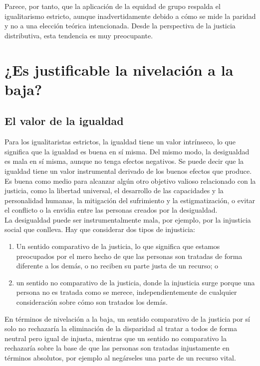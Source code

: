 Parece, por tanto, que la aplicación de la equidad de grupo respalda el igualitarismo estricto, aunque inadvertidamente debido a cómo se mide la paridad y no a una elección teórica intencionada. Desde la perspectiva de la justicia distributiva, esta tendencia es muy preocupante.

\section{¿Es justificable la nivelación a la baja?}
\subsection{El valor de la igualdad}
Para los igualitaristas estrictos, la igualdad tiene un valor intrínseco, lo que significa que la igualdad es buena en sí misma. Del mismo modo, la desigualdad es mala en sí misma, aunque no tenga efectos negativos. Se puede decir que la igualdad tiene un valor instrumental derivado de los buenos efectos que produce. Es buena como medio para alcanzar algún otro objetivo valioso relacionado con la justicia, como la libertad universal, el desarrollo de las capacidades y la personalidad humanas, la mitigación del sufrimiento y la estigmatización, o evitar el conflicto o la envidia entre las personas creados por la desigualdad.\\

La desigualdad puede ser instrumentalmente mala, por ejemplo, por la injusticia social que conlleva. Hay que considerar dos tipos de injusticia: 
\begin{enumerate}[(1)]
    \item Un sentido comparativo de la justicia, lo que significa que estamos preocupados por el mero hecho de que las personas son tratadas de forma diferente a los demás, o no reciben su parte justa de un recurso; o 
    \item un sentido no comparativo de la justicia, donde la injusticia surge porque una persona no es tratada como se merece, independientemente de cualquier consideración sobre cómo son tratados los demás.
\end{enumerate}
En términos de nivelación a la baja, un sentido comparativo de la justicia por sí solo no rechazaría la eliminación de la disparidad al tratar a todos de forma neutral pero igual de injusta, mientras que un sentido no comparativo la rechazaría sobre la base de que las personas son tratadas injustamente en términos absolutos, por ejemplo al negárseles una parte de un recurso vital.


